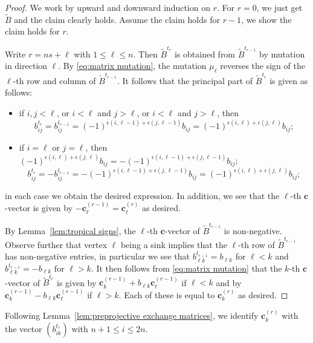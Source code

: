 \documentclass{amsart}
\newcommand{\sayDR}[1]{\say[DR]{\color{red}{\bf DR:}\;#1}}
\numberwithin{theorem}{section}
\newcommand{\bfc}{\boldsymbol{c}}
\begin{document}
  \begin{proof}
    We work by upward and downward induction on $r$.
    \sayDR{Downward case still needed}
    For $r=0$, we just get $\tilde B$ and the claim clearly holds.
    Assume the claim holds for $r-1$, we show the claim holds for $r$.

    Write $r=ns+\ell$ with $1 \le \ell \le n$.
    Then $\tilde B^{t_r}$ is obtained from $\tilde B^{t_{r-1}}$ by mutation in direction $\ell$.
    By \eqref{eq:matrix mutation}, the mutation $\mu_\ell$ reverses the sign of the $\ell$-th row and column of $\tilde B^{t_{r-1}}$.
    It follows that the principal part of $\tilde B^{t_r}$ is given as follows:
    \begin{itemize}
      \item if $i,j<\ell$, or $i<\ell$ and $j>\ell$, or $i<\ell$ and $j>\ell$, then 
        \[b^{t_r}_{ij}=b^{t_{r-1}}_{ij}=(-1)^{\epsilon(i,\ell-1)+\epsilon(j,\ell-1)}b_{ij}=(-1)^{\epsilon(i,\ell)+\epsilon(j,\ell)}b_{ij};\]
      \item if $i=\ell$ or $j=\ell$, then $(-1)^{\epsilon(i,\ell)+\epsilon(j,\ell)}b_{ij}=-(-1)^{\epsilon(i,\ell-1)+\epsilon(j,\ell-1)}b_{ij}$;
        \[b^{t_r}_{ij}=-b^{t_{r-1}}_{ij}=-(-1)^{\epsilon(i,\ell-1)+\epsilon(j,\ell-1)}b_{ij}=(-1)^{\epsilon(i,\ell)+\epsilon(j,\ell)}b_{ij};\]
    \end{itemize}
    in each case we obtain the desired expression.
    In addition, we see that the $\ell$-th $\bfc$-vector is given by $-\bfc^{(r-1)}_\ell=\bfc^{(r)}_\ell$ as desired.

    By Lemma~\ref{lem:tropical signs}, the $\ell$-th $\bfc$-vector of $\tilde B^{t_{r-1}}$ is non-negative.  
    Observe further that vertex $\ell$ being a sink implies that the $\ell$-th row of $\tilde B^{t_{r-1}}$ has non-negative entries, in particular we see that $b^{t_{r-1}}_{\ell k}=b_{\ell k}$ for $\ell<k$ and $b^{t_{r-1}}_{\ell k}=-b_{\ell k}$ for $\ell>k$.
    It then follows from \eqref{eq:matrix mutation} that the $k$-th $\bfc$-vector of $\tilde B^{t_r}$ is given by $\bfc^{(r-1)}_k+b_{\ell k}\bfc^{(r-1)}_\ell$ if $\ell<k$ and by $\bfc^{(r-1)}_k-b_{\ell k}\bfc^{(r-1)}_\ell$ if $\ell>k$.
    Each of these is equal to $\bfc^{(r)}_k$ as desired.
  \end{proof}

  Following Lemma~\ref{lem:preprojective exchange matrices}, we identify $\bfc^{(r)}_k$ with the vector $(b^{t_r}_{ik})$ with $n+1\le i\le 2n$.
\end{document}
